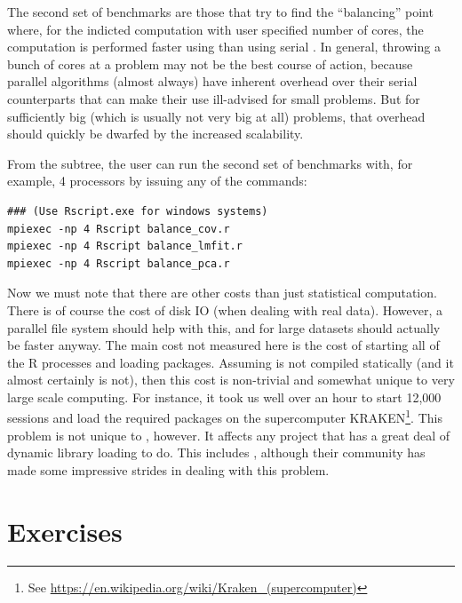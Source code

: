 The second set of benchmarks are those that try to find the ``balancing''
point where, for the indicted computation with user specified number of
cores, the computation is performed faster using \pbdR
than using serial . In general, throwing a bunch of cores at
a problem may not be the best course of action, because parallel algorithms
(almost always) have inherent overhead over their serial counterparts that
can make their use ill-advised for small problems. But for sufficiently
big (which is usually not very big at all) problems, that overhead should
quickly be dwarfed by the increased scalability.

From the  subtree, the user can run the second set of
benchmarks with, for example, 4 processors by issuing any of the commands:
\begin{lstlisting}
### (Use Rscript.exe for windows systems)
mpiexec -np 4 Rscript balance_cov.r
mpiexec -np 4 Rscript balance_lmfit.r
mpiexec -np 4 Rscript balance_pca.r
\end{lstlisting}

Now we must note that there are other costs than just statistical
computation. There is of course the cost of disk IO (when dealing with real
data). However, a parallel file system should help with this, and for large
datasets should actually be faster anyway. The main cost not measured here
is the cost of starting all of the R processes and loading packages.
Assuming  is not compiled statically (and it almost certainly
is not), then this cost is non-trivial and somewhat unique to very large
scale computing. For instance, it took us well over an hour to start
12,000  sessions and load the required packages on the
supercomputer
KRAKEN\footnote{See \url{https://en.wikipedia.org/wiki/Kraken_(supercomputer)}}.  This problem is not unique to , however.  It affects any project that has a great deal of dynamic library loading to do.  This includes , although their community has made some impressive strides in dealing with this problem.




\section{Exercises}
\label{sec:introduction_exercise}

